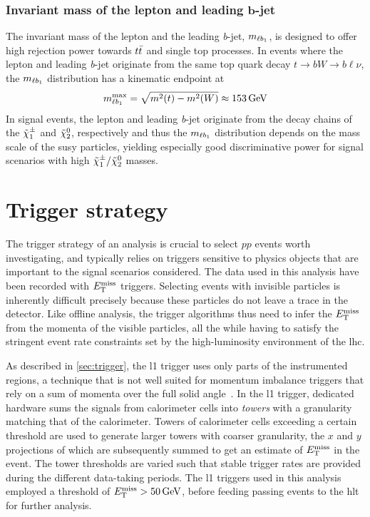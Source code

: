 \subsubsection[Invariant mass of the lepton and leading \textit{b}-jet]{Invariant mass of the lepton and leading $\boldsymbol{b}$-jet}

The invariant mass of the lepton and the leading \textit{b}-jet, $m_{\ell b_{1}}$, is designed to offer high rejection power towards $t\bar{t}$ and single top processes. In events where the lepton and leading \textit{b}-jet originate from the same top quark decay $t\rightarrow bW \rightarrow b\ell\nu$, the $m_{\ell b_{1}}$ distribution has a kinematic endpoint at 
\begin{equation}
	\mlb^\mathrm{max} = \sqrt{m^2(t)-m^2(W)} \approx \SI{153}{\GeV} 
\end{equation}
In signal events, the lepton and leading \textit{b}-jet originate from the decay chains of the $\tilde{\chi}_1^\pm$ and $\tilde{\chi}_2^0$, respectively and thus the $m_{\ell b_{1}}$ distribution depends on the mass scale of the \gls{susy} particles, yielding especially good discriminative power for signal scenarios with high $\tilde{\chi}_1^\pm/\tilde{\chi}_2^0$ masses.

\section{Trigger strategy}\label{sec:trigger_strategy}

The trigger strategy of an analysis is crucial to select $pp$ events worth investigating, and typically relies on triggers sensitive to physics objects that are important to the signal scenarios considered. The data used in this analysis have been recorded with $E_{\textrm{T}}^{\textrm{miss}}$ triggers. Selecting events with invisible particles is inherently difficult precisely because these particles do not leave a trace in the detector. Like offline analysis, the trigger algorithms thus need to infer the $E_{\textrm{T}}^{\textrm{miss}}$ from the momenta of the visible particles, all the while having to satisfy the stringent event rate constraints set by the high-luminosity environment of the \gls{lhc}.

As described in \cref{sec:trigger}, the \gls{l1} trigger uses only parts of the instrumented regions, a technique that is not well suited for momentum imbalance triggers that rely on a sum of momenta over the full solid angle~\cite{Aad:2020les}. In the \gls{l1} trigger, dedicated hardware sums the signals from calorimeter cells into \textit{towers} with a granularity matching that of the calorimeter. Towers of calorimeter cells exceeding a certain threshold are used to generate larger towers with coarser granularity, the $x$ and $y$ projections of which are subsequently summed to get an estimate of $E_{\textrm{T}}^{\textrm{miss}}$ in the event. The tower thresholds are varied such that stable trigger rates are provided during the different data-taking periods. The \gls{l1} triggers used in this analysis employed a threshold of $\etmiss > \SI{50}{\GeV}$, before feeding passing events to the \gls{hlt} for further analysis. 

